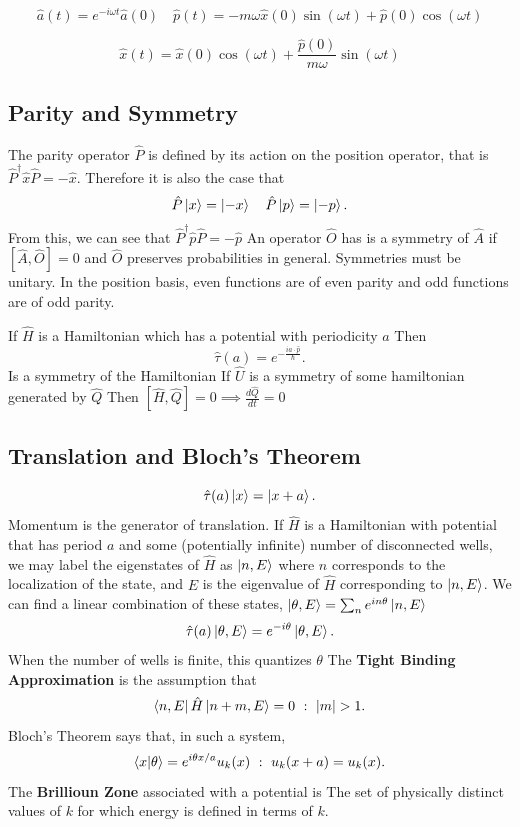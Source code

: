 \documentclass{article}
\begin{document}
      \[
        \hat{a}(t) = e^{-i \omega t}\hat{a}(0) \quad 
        \hat{p}(t) = - m \omega \hat{x}(0) \sin(\omega t) + \hat{p}(0) \cos(\omega t) 
      \]
    
      \[
        \hat{x}(t) = \hat{x}(0) \cos(\omega t) + \frac{\hat{p}(0)}{m \omega }\sin(\omega t)
      \]
    \subsection*{Parity and Symmetry}    
      The parity operator $\hat{P}$ is defined by its action on the position 
      operator, that is  $\hat{P}^\dagger \hat{x} \hat{P} = - \hat{x}$. Therefore
      it is also the case that \[
        \hat{P}\ket{x} = \ket{-x}  \quad \hat{P}\ket{p} = \ket{-p}
      .\] 
      From this, we can see that $\hat{P}^{\dagger}\hat{p}\hat{P} = -\hat{p}$ 
      An operator $\hat{O}$ has is a symmetry of $\hat{A}$ if 
      $[\hat{A},\hat{O}]=0$ and $\hat{O}$ preserves probabilities in general.
      Symmetries must be unitary.
      In the position basis, even functions are of even parity and odd 
      functions are of odd parity.
      
      If $\hat{H}$ is a Hamiltonian which has a potential with periodicity  $a$
      Then 
      \[
        \hat{\tau}(a) = e^{-\frac{i a \cdot \hat{p} }{\hbar}}
      .\]  
      Is a symmetry of the Hamiltonian 
      If $\hat{U}$ is a symmetry of some hamiltonian generated by  $\hat{Q}$
      Then  $[\hat{H},\hat{Q}] = 0 \implies \frac{d\hat{Q}}{dt} = 0$

    \subsection*{Translation and Bloch's Theorem}
      \[
        \hat{\tau}(a) \ket{x} = \ket{x + a}
      .\]  
      Momentum is the generator of translation. 
      If $\hat{H}$ is a Hamiltonian with potential that has period $a$
      and some (potentially infinite) number of disconnected wells, we may 
      label the eigenstates of  $\hat H$ as  $ \ket{n,E}$ where  $n$ 
      corresponds to the localization of the state, and  $E$ is the eigenvalue
      of  $\hat H $ corresponding to  $\ket{n,E}$. We can find a linear 
      combination of these states, $\ket{\theta,E} = \sum_n e^{i n \theta}\ket{n,E}$
      \[
        \hat{\tau}(a) \ket{\theta,E} = e^{-i\theta}\ket{\theta,E}
      .\] 
      When the number of wells is finite, this quantizes $\theta$
      The \textbf{Tight Binding Approximation} is the assumption that 
      \[
        \bra{n,E}\hat{H}\ket{n+m,E}=0 \,\,:\,\, |m| > 1
      .\] 
     Bloch's Theorem says that, in such a system, \[
       \bra{x}\ket{\theta}= e^{i \theta x /a}u_k(x) \,\,:\,\, u_k(x + a) = u_k(x)
     .\]  
     The \textbf{Brillioun Zone} associated with a potential is 
     The set of physically distinct values of $k$ for which energy is defined 
     in terms of  $k$.
\end{document}
